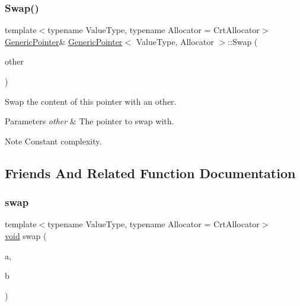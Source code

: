 \subsubsection{\texorpdfstring{Swap()}{Swap()}}
{\footnotesize\ttfamily template$<$typename Value\+Type, typename Allocator = Crt\+Allocator$>$ \\
\hyperlink{classGenericPointer}{Generic\+Pointer}\& \hyperlink{classGenericPointer}{Generic\+Pointer}$<$ Value\+Type, Allocator $>$\+::Swap (\begin{DoxyParamCaption}\item[{\hyperlink{classGenericPointer}{Generic\+Pointer}$<$ Value\+Type, Allocator $>$ \&}]{other }\end{DoxyParamCaption})\hspace{0.3cm}{\ttfamily [inline]}}



Swap the content of this pointer with an other. 


\begin{DoxyParams}{Parameters}
{\em other} & The pointer to swap with. \\
\hline
\end{DoxyParams}
\begin{DoxyNote}{Note}
Constant complexity. 
\end{DoxyNote}


\subsection{Friends And Related Function Documentation}
\mbox{\label{classGenericPointer_a249c61b5d4bed20c3f8972c57f46a937}} 
\subsubsection{\texorpdfstring{swap}{swap}}
{\footnotesize\ttfamily template$<$typename Value\+Type, typename Allocator = Crt\+Allocator$>$ \\
\hyperlink{imgui__impl__opengl3__loader_8h_ac668e7cffd9e2e9cfee428b9b2f34fa7}{void} swap (\begin{DoxyParamCaption}\item[{\hyperlink{classGenericPointer}{Generic\+Pointer}$<$ Value\+Type, Allocator $>$ \&}]{a,  }\item[{\hyperlink{classGenericPointer}{Generic\+Pointer}$<$ Value\+Type, Allocator $>$ \&}]{b }\end{DoxyParamCaption})\hspace{0.3cm}{\ttfamily [friend]}}



